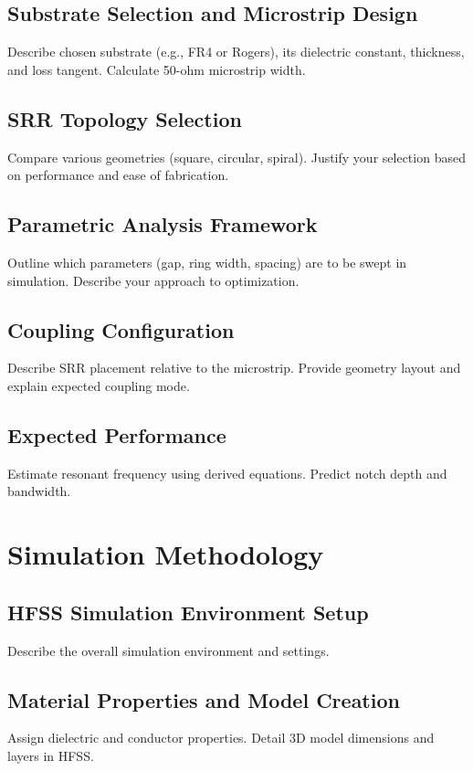 \documentclass[conference]{IEEEtran}
\begin{document}
\subsection{Substrate Selection and Microstrip Design}
Describe chosen substrate (e.g., FR4 or Rogers), its dielectric constant, thickness, and loss tangent. Calculate 50-ohm microstrip width.

\subsection{SRR Topology Selection}
Compare various geometries (square, circular, spiral). Justify your selection based on performance and ease of fabrication.

\subsection{Parametric Analysis Framework}
Outline which parameters (gap, ring width, spacing) are to be swept in simulation. Describe your approach to optimization.

\subsection{Coupling Configuration}
Describe SRR placement relative to the microstrip. Provide geometry layout and explain expected coupling mode.

\subsection{Expected Performance}
Estimate resonant frequency using derived equations. Predict notch depth and bandwidth.

\section{Simulation Methodology}

\subsection{HFSS Simulation Environment Setup}
Describe the overall simulation environment and settings.

\subsection{Material Properties and Model Creation}
Assign dielectric and conductor properties. Detail 3D model dimensions and layers in HFSS.
\end{document}
